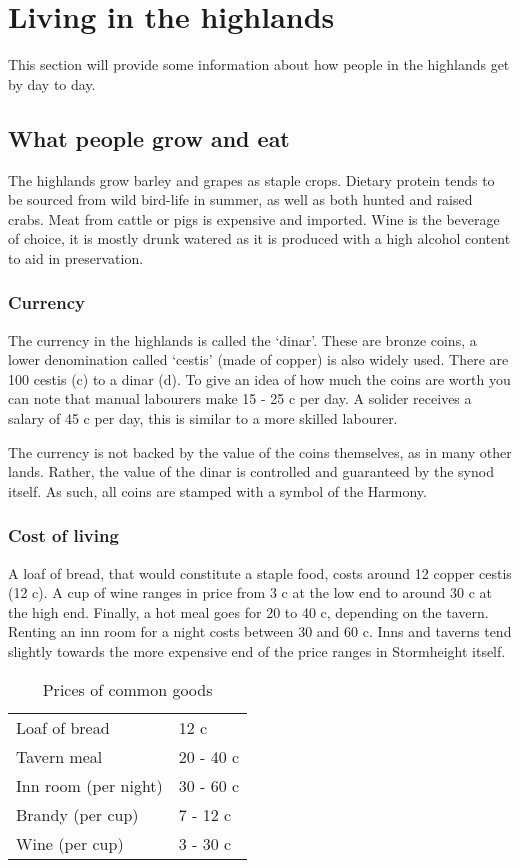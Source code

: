 \documentclass[a4paper,11pt,oneside]{book}
\begin{document}
\section{Living in the highlands}
This section will provide some information about how people in the highlands get by day to day.

\subsection{What people grow and eat}
The highlands grow barley and grapes as staple crops. Dietary protein tends to be sourced from wild bird-life in summer, as well as both hunted and raised crabs. Meat from cattle or pigs is expensive and imported. Wine is the beverage of choice, it is mostly drunk watered as it is produced with a high alcohol content to aid in preservation. 

\subsubsection{Currency}
The currency in the highlands is called the `dinar'. These are bronze coins, a lower denomination called `cestis' (made of copper) is also widely used. There are 100 cestis (c) to a dinar (d). To give an idea of how much the coins are worth you can note that manual labourers make 15 - 25 c per day. A solider receives a salary of 45 c per day, this is similar to a more skilled labourer. 

The currency is not backed by the value of the coins themselves, as in many other lands. Rather, the value of the dinar is controlled and guaranteed by the synod itself. As such, all coins are stamped with a symbol of the Harmony. 

\subsubsection{Cost of living}
A loaf of bread, that would constitute a staple food, costs around 12 copper cestis (12 c). A cup of wine ranges in price from 3 c at the low end to around 30 c at the high end. Finally, a hot meal goes for 20 to 40 c, depending on the tavern. Renting an inn room for a night costs between 30 and 60 c. Inns and taverns tend slightly towards the more expensive end of the price ranges in Stormheight itself.  

\begin{table}[ht!]
	\centering
	\begin{tabular}{|l|l|}
		\hline
		Loaf of bread & 12 c \\
		Tavern meal & 20 - 40 c \\
		Inn room (per night) & 30 - 60 c \\
		Brandy (per cup) & 7 - 12 c \\
		Wine (per cup) & 3 - 30 c \\
		\hline		
	\end{tabular}
\caption{Prices of common goods}
\end{table}
\end{document}

